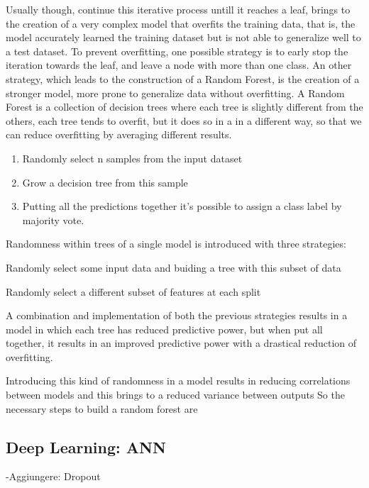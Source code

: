 \documentclass[a4paper,11pt]{article}
\begin{document}
Usually though, continue this iterative process untill it reaches a leaf, brings to the creation of a very complex model that overfits the training data, that is, the model accurately learned the training dataset but is not able to generalize well to a test dataset.
To prevent overfitting, one possible strategy is to early stop the iteration towards the leaf, and leave a node with more than one class.
An other strategy, which leads to the construction of a Random Forest, is the creation of a stronger model, more prone to generalize data without overfitting.
A Random Forest is a collection of decision trees where each tree is slightly different from the others, each tree tends to overfit, but it does so in a in a different way, so that we can reduce overfitting by averaging different results.

\begin{enumerate}
\item Randomly select n samples from the input dataset
\item Grow a decision tree from this sample
\item Putting all the predictions together it's possible to assign a class label by majority vote.
\end{enumerate}



Randomness within trees of a single model is introduced with three strategies:
\begin{enumerate*}
\item Randomly select some input data and buiding a tree with this subset of data
\item Randomly select a different subset of features at each split
\item A combination and implementation of both the previous strategies results in a model in which each tree has reduced predictive power, but when put all together, it results in an improved predictive power with a drastical reduction of overfitting.
\end{enumerate*}

Introducing this kind of randomness in a model results in reducing correlations between models and this brings to a reduced variance between outputs
So the necessary steps to build a random forest are



\subsection{Deep Learning: ANN}
-Aggiungere: Dropout
\end{document}
